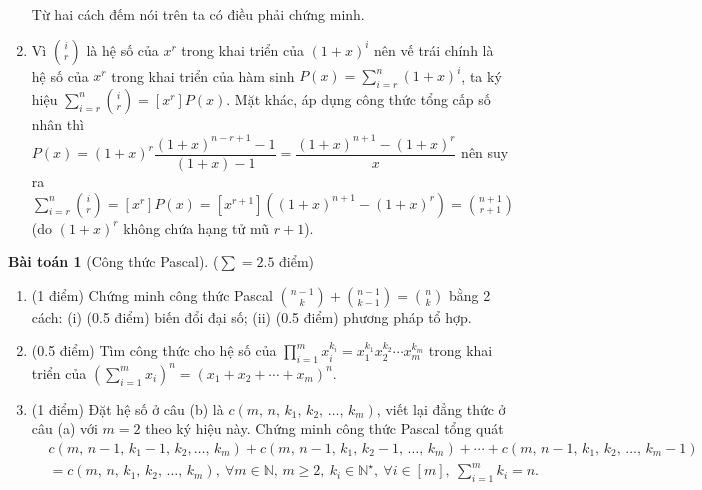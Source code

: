 \documentclass[a4paper, 11pt]{article}
\theoremstyle{definition}
\newtheorem{baitoan}{Bài toán}
\begin{document}
\begin{enumerate}[label=(\alph*)]
\begin{itemize}
		\end{itemize}Từ hai cách đếm nói trên ta có điều phải chứng minh.
		\item Vì $\displaystyle {i \choose r}$ là hệ số của $x^r$ trong khai triển của $(1+x)^i$ nên vế trái chính là hệ số của $x^r$ trong khai triển của hàm sinh $\displaystyle P(x) = \sum\limits_{i=r}^n (1+x)^i$, ta ký hiệu $\displaystyle \sum\limits_{i=r}^n {i \choose r} = \left[x^r\right]P(x)$. Mặt khác, áp dụng công thức tổng cấp số nhân thì $P(x) = (1+x)^r \dfrac{(1+x)^{n-r+1}-1}{(1+x)-1} = \dfrac{(1+x)^{n+1} - (1+x)^r}{x}$ nên suy ra $\displaystyle \sum\limits_{i=r}^n {i \choose r} = \left[x^r\right]P(x) = \left[x^{r+1}\right]\left((1+x)^{n+1} - (1+x)^r\right) = {n+1\choose r+1}$ (do $(1+x)^r$ không chứa hạng tử mũ $r+1$).
	\end{enumerate}

	\begin{tcolorbox}[breakable]
    	\begin{baitoan}[Công thức Pascal]
			($\sum = 2.5$ điểm) 
			\begin{enumerate}[label=(\alph*)]
				\item (1 điểm) Chứng minh công thức Pascal $\displaystyle {n-1\choose k} + {n-1 \choose k-1} = {n\choose k}$ bằng 2 cách: (i) (0.5 điểm) biến đổi đại số; (ii) (0.5 điểm) phương pháp tổ hợp.
				\item (0.5 điểm) Tìm công thức cho hệ số của $\displaystyle \prod\limits_{i=1}^m x_i^{k_i} = x_1^{k_1}x_2^{k_2}\cdots x_m^{k_m}$ trong khai triển của $\left(\sum\limits_{i=1}^m x_i\right)^n = (x_1 + x_2 + \cdots + x_m)^n$.
				\item (1 điểm) Đặt hệ số ở câu (b) là $c(m,\,n,\,k_1,\,k_2,\,\ldots,\,k_m)$, viết lại đẳng thức ở câu (a) với $m=2$ theo ký hiệu này. Chứng minh công thức Pascal tổng quát 
				\begin{align*}
					&c(m,\,n - 1,\,k_1 - 1,\,k_2,\ldots,\,k_m) + c(m,\,n - 1,\,k_1,\,k_2 - 1,\,\ldots,\,k_m) + \cdots + c(m,\,n - 1,\,k_1,\,k_2,\,\ldots,\,k_m - 1)\\
					&= c(m,\,n,\,k_1,\,k_2,\,\ldots,\,k_m),\ \forall m\in\mathbb{N},\,m\ge2,\ k_i\in\mathbb{N}^\star,\ \forall i\in[m],\ \sum_{i=1}^m k_i = n.
				\end{align*}
			\end{enumerate}
		\end{baitoan}
	\end{tcolorbox}
\end{document}
